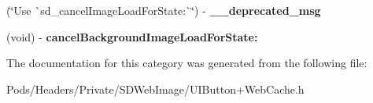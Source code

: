 \begin{DoxyCompactItemize}
\item 
\mbox{\label{category_u_i_button_07_web_cache_deprecated_08_ac9c0b556cb6bb0fbc754731fc11cda71}} 
(\char`\"{}Use \`{}sd\+\_\+cancel\+Image\+Load\+For\+State\+:\`{}\char`\"{}) -\/ {\bfseries \+\_\+\+\_\+deprecated\+\_\+msg}
\item 
\mbox{\label{category_u_i_button_07_web_cache_deprecated_08_a9d1a17c9dd04afddb7e71ab0b5de3742}} 
(void) -\/ {\bfseries cancel\+Background\+Image\+Load\+For\+State\+:}
\end{DoxyCompactItemize}


The documentation for this category was generated from the following file\+:\begin{DoxyCompactItemize}
\item 
Pods/\+Headers/\+Private/\+S\+D\+Web\+Image/U\+I\+Button+\+Web\+Cache.\+h\end{DoxyCompactItemize}
